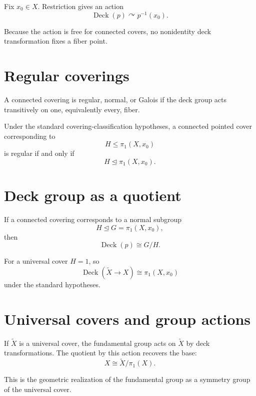 Fix \(x_0\in X\).  Restriction gives an action
\[
\operatorname{Deck}(p)\curvearrowright p^{-1}(x_0).
\]

Because the action is free for connected covers, no nonidentity deck
transformation fixes a fiber point.

\section{Regular coverings}

\begin{definition}
\label{def:viii12-regular}
A connected covering is regular, normal, or Galois if the deck group acts
transitively on one, equivalently every, fiber.
\end{definition}

\begin{theorem}
\label{thm:viii12-normal}
Under the standard covering-classification hypotheses, a connected pointed
cover corresponding to
\[
H\le \pi_1(X,x_0)
\]
is regular if and only if
\[
H\trianglelefteq\pi_1(X,x_0).
\]
\end{theorem}

\section{Deck group as a quotient}

\begin{theorem}
\label{thm:viii12-quotient}
If a connected covering corresponds to a normal subgroup
\[
H\trianglelefteq G=\pi_1(X,x_0),
\]
then
\[
\operatorname{Deck}(p)\cong G/H.
\]
\end{theorem}

For a universal cover \(H=1\), so
\[
\operatorname{Deck}(\widetilde X\to X)
\cong
\pi_1(X,x_0)
\]
under the standard hypotheses.

\section{Universal covers and group actions}

If \(\widetilde X\) is a universal cover, the fundamental group acts on
\(\widetilde X\) by deck transformations.  The quotient by this action recovers
the base:
\[
X\cong \widetilde X/\pi_1(X).
\]

This is the geometric realization of the fundamental group as a symmetry group
of the universal cover.


